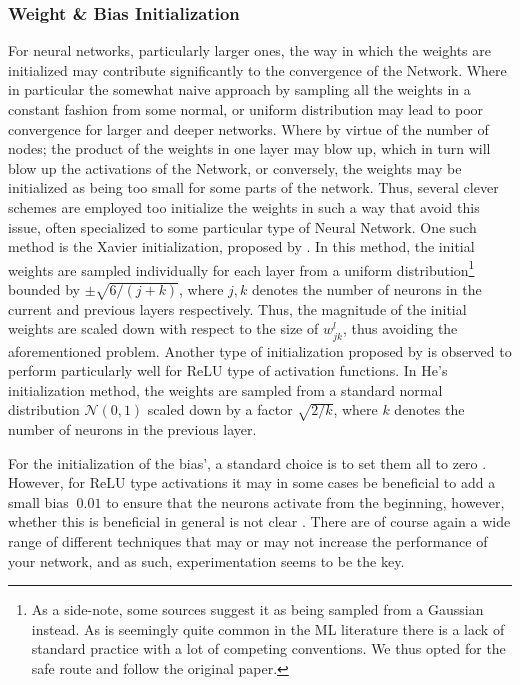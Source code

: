 \documentclass[reprint, english, nofootinbib]{revtex4-2}
\begin{document}
\subsubsection{Weight \& Bias Initialization}
\noindent
For neural networks, particularly larger ones, the way in which the weights are initialized may contribute significantly to the convergence of the Network. Where in particular the somewhat naive approach by sampling all the weights in a constant fashion from some normal, or uniform distribution may lead to poor convergence for larger and deeper networks. Where by virtue of the number of nodes; the product of the weights in one layer may blow up, which in turn will blow up the activations of the Network, or conversely, the weights may be initialized as being too small for some parts of the network. Thus, several clever schemes are employed too initialize the weights in such a way that avoid this issue, often specialized to some particular type of Neural Network. One such method is the Xavier initialization, proposed by \textcite{xavier}. In this method, the initial weights are sampled individually for each layer from a uniform distribution\footnote{As a side-note, some sources suggest it as being sampled from a Gaussian instead. As is seemingly quite common in the ML literature there is a lack of standard practice with a lot of competing conventions. We thus opted for the safe route and follow the original paper.} bounded by $\pm \sqrt{6/(j + k)}$, where $j, k$ denotes the number of neurons in the current and previous layers respectively. Thus, the magnitude of the initial weights are scaled down with respect to the size of $w^l_{jk}$, thus avoiding the aforementioned problem. Another type of initialization proposed by \textcite{he2015delving} is observed to perform particularly well for ReLU type of activation functions. In He's initialization method, the weights are sampled from a standard normal distribution $\mathcal N(0, 1)$ scaled down by a factor $\sqrt{2/k}$, where $k$ denotes the number of neurons in the previous layer.

For the initialization of the bias', a standard choice is to set them all to zero \textcite{Aggarwall}. However, for ReLU type activations it may in some cases be beneficial to add a small bias $~0.01$ to ensure that the neurons activate from the beginning, however, whether this is beneficial in general is not clear \cite{CS231n}. There are of course again a wide range of different techniques that may or may not increase the performance of your network, and as such, experimentation seems to be the key.
\end{document}
